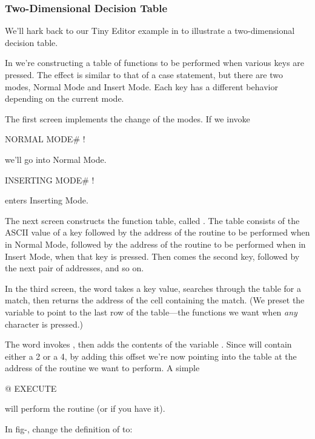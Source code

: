 \subsubsection{Two-Dimensional Decision Table}%
%

We'll hark back to our Tiny Editor example in  to illustrate
a two-dimensional decision table.

In  we're constructing a table of functions to be performed
when various keys are pressed. The effect is similar to that of a
case statement, but there are two modes, Normal Mode and Insert Mode.
Each key has a different behavior depending on the current mode.

The first screen implements the change of the modes. If we invoke

\begin{Code}
NORMAL MODE# !
\end{Code}
we'll go into Normal Mode.

\begin{Code}
INSERTING MODE# !
\end{Code}
enters Inserting Mode.

The next screen constructs the function table, called .
The table consists of the ASCII value of a key followed by the address of
the routine to be performed when in Normal Mode, followed by the address
of the routine to be performed when in Insert Mode, when that key
is pressed. Then comes the second key, followed by the next pair of
addresses, and so on.

In the third screen, the word  takes a key value,
searches through the  table for a match, then returns the
address of the cell containing the match. (We preset the variable
 to point to the last row of the table---the functions we want
when \emph{any} character is pressed.)

The word  invokes , then adds the contents
of the variable . Since  will contain either a
2 or a 4, by adding this offset we're now pointing into the table at the
address of the routine we want to perform. A simple

\begin{Code}
@ EXECUTE
\end{Code}
will perform the routine (or  if you have it).

In fig-\Forth{}, change the definition of  to:

